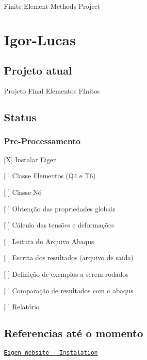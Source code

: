 Finite Element Method\textquotesingle{}s Project

\section*{Igor-\/\+Lucas}

\subsection*{Projeto atual}

Projeto Final Elementos F\+Initos

\subsection*{Status}

\subsubsection*{Pre-\/\+Processamento}


\begin{DoxyItemize}
\item \mbox{[}X\mbox{]} Instalar Eigen
\item \mbox{[} \mbox{]} Classe Elementos (Q4 e T6)
\item \mbox{[} \mbox{]} Classe Nó
\item \mbox{[} \mbox{]} Obtenção das propriedades globais
\item \mbox{[} \mbox{]} Cálculo das tensões e deformações
\item \mbox{[} \mbox{]} Leitura do Arquivo Abaqus
\item \mbox{[} \mbox{]} Escrita dos resultados (arquivo de saida)
\item \mbox{[} \mbox{]} Definição de exemplos a serem rodados
\item \mbox{[} \mbox{]} Comparação de resultados com o abaqus
\item \mbox{[} \mbox{]} Relatório
\end{DoxyItemize}

\subsection*{Referencias até o momento}

\href{http://eigen.tuxfamily.org/index.php?title=IDEs#Visual_Studio}{\tt Eigen Website -\/ Instalation} 